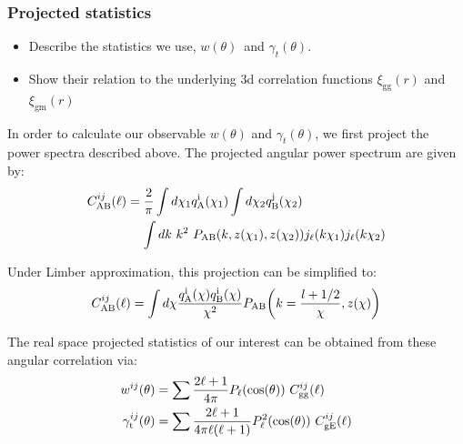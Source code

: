 \documentclass[fleqn,usenatbib]{mnras}
\newcommand{\gammat}{\ensuremath{\gamma_{t}(\theta)}}
\newcommand{\wtheta}{\ensuremath{w(\theta)}}
\newcommand{\xigg}{\ensuremath{\xi_{\mathrm{gg}}} }
\newcommand{\xigm}{\ensuremath{\xi_{\mathrm{gm}}} }
\begin{document}
\subsubsection{Projected statistics}
\label{sec:proj_2pt}
\begin{itemize}
    \item Describe the statistics we use, \wtheta\ and \gammat.
    \item Show their relation to the underlying 3d correlation functions $\xigg(r)$ and $\xigm(r)$
\end{itemize}

In order to calculate our observable $\wtheta$ and $\gammat$, we first project the power spectra described above. The projected angular power spectrum are given by:
\begin{align}
    C^{ij}_{\rm AB}(\ell) &= \frac{2}{\pi} \int d\chi_1 q^{\rm i}_{\rm A}(\chi_1) \int d\chi_2 q^{\rm j}_{\rm B}(\chi_2) \nonumber \\
    &\mathrel{\phantom{=}} \int dk \ k^2 \ P_{\rm AB}(k,z(\chi_1),z(\chi_2)) j_{\ell}(k \chi_1) j_{\ell}(k \chi_2)
\end{align}

Under Limber approximation, this projection can be simplified to:
\begin{equation}
    C^{ij}_{\rm AB}(\ell)  = \int d\chi \frac{q^{\rm i}_{\rm A}(\chi) q^{\rm i}_{\rm B}(\chi)}{\chi^2} P_{\rm AB}\bigg(k=\frac{l + 1/2}{\chi},z(\chi)\bigg) 
\end{equation}

The real space projected statistics of our interest can be obtained from these angular correlation via:
\begin{align}
    w^{ij}(\theta) &= \sum \frac{2\ell + 1}{4\pi} P_{\ell}(\cos(\theta)) \ C^{ij}_{\rm gg}(\ell) \\
    \gamma_{\rm t}^{ij}(\theta) &= \sum \frac{2\ell + 1}{4\pi \ell (\ell + 1)} P_{\ell}^2(\cos(\theta)) \ C^{ij}_{\rm gE}(\ell)
\end{align}
\end{document}

